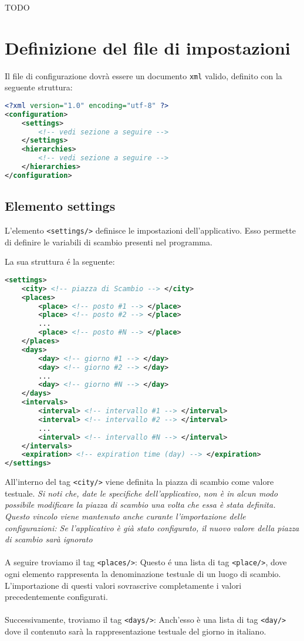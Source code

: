 TODO

\section{Definizione del file di impostazioni}\label{sec:settings-file-format}

Il file di configurazione dovrà essere un documento \texttt{xml} valido, definito con la seguente struttura:
\begin{lstlisting}[language=XML]
<?xml version="1.0" encoding="utf-8" ?>
<configuration>
    <settings>
        <!-- vedi sezione a seguire -->
    </settings>
    <hierarchies>
        <!-- vedi sezione a seguire -->
    </hierarchies>
</configuration>
\end{lstlisting}

\pagebreak
\subsection{Elemento settings}
L'elemento \verb|<settings/>| definisce le impostazioni dell'applicativo.
Esso permette di definire le variabili di scambio presenti nel programma.

La sua struttura é la seguente:
\begin{lstlisting}[language=XML]
<settings>
    <city> <!-- piazza di Scambio --> </city>
    <places>
        <place> <!-- posto #1 --> </place>
        <place> <!-- posto #2 --> </place>
        ...
        <place> <!-- posto #N --> </place>
    </places>
    <days>
        <day> <!-- giorno #1 --> </day>
        <day> <!-- giorno #2 --> </day>
        ...
        <day> <!-- giorno #N --> </day>
    </days>
    <intervals>
        <interval> <!-- intervallo #1 --> </interval>
        <interval> <!-- intervallo #2 --> </interval>
        ...
        <interval> <!-- intervallo #N --> </interval>
    </intervals>
    <expiration> <!-- expiration time (day) --> </expiration>
</settings>
\end{lstlisting}

All'interno del tag \verb|<city/>| viene definita la piazza di scambio come valore testuale.
\textit{Si noti che, date le specifiche dell'applicativo, non è in alcun modo possibile modificare la piazza di scambio una volta che essa è stata definita.}
\textit{Questo vincolo viene mantenuto anche curante l'importazione delle configurazioni: Se l'applicativo è già stato configurato, il nuovo valore della piazza di scambio sarà ignorato}
\\\\
A seguire troviamo il tag \verb|<places/>|: Questo é una lista di tag \verb|<place/>|, dove ogni elemento rappresenta la denominazione testuale di un luogo di scambio.
L'importazione di questi valori sovrascrive completamente i valori precedentemente configurati.
\\\\
Successivamente, troviamo il tag \verb|<days/>|: Anch'esso è una lista di tag \verb|<day/>| dove il contenuto sarà la rappresentazione testuale del giorno in italiano.

